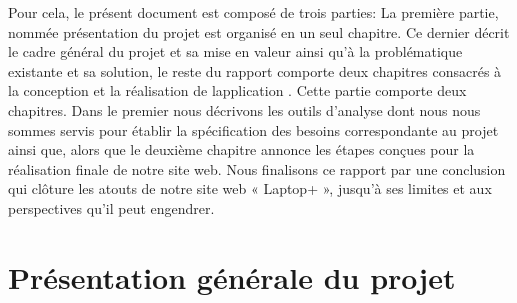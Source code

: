 \documentclass[a4paper]{report}
\begin{document}
\begin{doublespace}
Pour cela, le présent document est composé de trois parties: La première partie, nommée présentation du projet
est organisé en un seul chapitre. Ce dernier décrit le cadre général du projet et sa mise en valeur ainsi qu’à la problématique existante et sa solution, le reste du rapport comporte deux chapitres consacrés à la conception et la réalisation de lapplication . Cette partie comporte deux chapitres. Dans le premier nous décrivons les outils d’analyse dont nous nous sommes servis pour établir la spécification des besoins correspondante au projet ainsi que, alors que le deuxième chapitre annonce les étapes conçues pour la réalisation finale de notre site web.
Nous finalisons ce rapport par une conclusion qui clôture les atouts de notre site web « Laptop+ », jusqu’à ses limites et aux perspectives qu’il peut engendrer.






\end{doublespace}

\newpage

\chapter{Présentation générale du projet}
\end{document}

